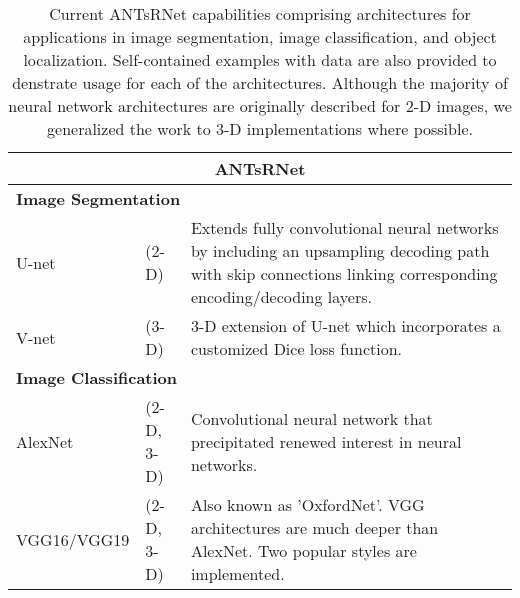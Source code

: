 

\begin{table}[!htb]
\centering
\caption{Current ANTsRNet capabilities comprising architectures for applications in 
image segmentation, image classification, and object localization.  Self-contained
examples with data are also provided to denstrate usage for each of the architectures.
Although the majority of neural network architectures are originally described
for 2-D images, we generalized the work to 3-D implementations where possible.}
\label{table:antsrnet}
\begin{tabular*}{\textwidth}{ll@{\extracolsep{\fill}}l}
\toprule
\multicolumn{3}{c}{\textbf{ANTsRNet}}    \\        
\midrule
\multicolumn{3}{l}{\textbf{Image Segmentation}}
  \vspace{0.25cm} \\ \vspace{0.2cm} 
  U-net \cite{Ronneberger:2015} & (2-D) & 
    \begin{minipage}[t]{0.6\columnwidth}%
        Extends fully convolutional neural networks by 
        including an upsampling decoding path with skip connections 
        linking corresponding encoding/decoding layers. %
    \end{minipage} \\ \vspace{0.3cm} 
  V-net \cite{Milletari:2016} & (3-D) &
    \begin{minipage}[t]{0.6\columnwidth}%
        3-D extension of U-net which incorporates a customized
        Dice loss function. %
    \end{minipage} \\
\midrule
\multicolumn{3}{l}{\textbf{Image Classification}} 
  \vspace{0.25cm} \\ \vspace{0.2cm} 
  AlexNet \cite{Krizhevsky:2012} & (2-D, 3-D) & 
    \begin{minipage}[t]{0.6\columnwidth}%
        Convolutional neural network that precipitated renewed
        interest in neural networks.
    \end{minipage} \\ \vspace{0.2cm} 
  VGG16/VGG19 \cite{Simonyan:2014} & (2-D, 3-D) & 
    \begin{minipage}[t]{0.6\columnwidth}%
        Also known as 'OxfordNet'.  VGG architectures are much 
        deeper than AlexNet.  Two popular styles are implemented. %

\end{minipage}
\end{tabular*}
\end{table}
